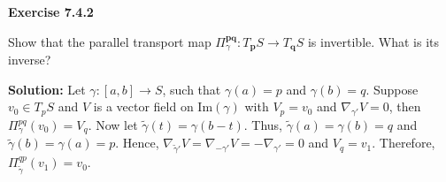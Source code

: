\documentclass[12pt, a4paper]{article}
\begin{document}
\begin{flushleft}

    \textbf{Exercise 7.4.2}\par
    
\vspace{4mm}

    Show that the parallel transport map $\Pi^{\mathbf{pq}}_{\gamma}\colon T_{\mathbf{p}}S\rightarrow T_{\mathbf{q}}S$ is invertible. What is its inverse?
    
\vspace{4mm}

    \textbf{Solution: }Let $\gamma\colon[a,b]\rightarrow S$, such that $\gamma(a)=p$ and $\gamma(b)=q$. Suppose $v_0\in T_pS$ and $V$ is a vector field on Im$(\gamma)$ with $V_p=v_0$ and $\nabla_{\gamma'}V=0$, then $\Pi^{pq}_{\gamma}(v_0)=V_q$. Now let $\tilde{\gamma}(t)=\gamma(b-t)$. Thus, $\tilde{\gamma}(a)=\gamma(b)=q$ and $\tilde{\gamma}(b)=\gamma(a)=p$. Hence, $\nabla_{\tilde{\gamma}'}V=\nabla_{-\gamma'}V=-\nabla_{\gamma'}=0$ and $V_q=v_1$. Therefore, $\Pi^{qp}_{\tilde{\gamma}}(v_1)=v_0$.

\end{flushleft}



\vspace{8mm}
\end{document}
